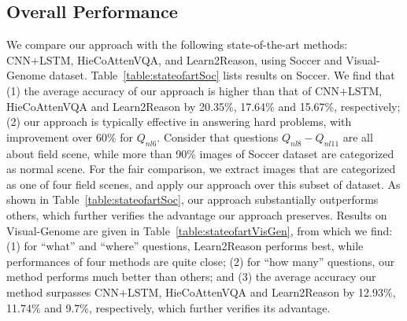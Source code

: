 %
%
%
%

\subsection{Overall Performance}
\label{sec-overall-performance}

We compare our approach with the following state-of-the-art methods: CNN+LSTM, HieCoAttenVQA, and Learn2Reason, using Soccer and Visual-Genome dataset. 
Table~\ref{table:stateofartSoc} lists results on Soccer. We find that (1) the average accuracy of our approach is higher than that of CNN+LSTM, HieCoAttenVQA and Learn2Reason by 20.35\%, 17.64\% and 15.67\%,  respectively; (2) our approach is typically effective in answering hard problems, \eg with improvement over 60\% for $Q_{nl6}$. 
Consider that questions $Q_{nl8}-Q_{nl11}$ are all about field scene, while more than 90\% images of Soccer dataset are categorized as normal scene. For the fair comparison, we extract images that are categorized as one of four field scenes, and apply our approach over this subset of dataset. As shown in Table~\ref{table:stateofartSoc}, our approach substantially outperforms others, which further verifies the advantage our approach preserves. 
Results on Visual-Genome are given in Table~\ref{table:stateofartVisGen}, from which we find: (1) for ``what'' and ``where'' questions, Learn2Reason performs best, while performances of four methods are quite close; (2) for ``how many'' questions, our method performs much better than others; and (3) the average accuracy our method  surpasses CNN+LSTM, HieCoAttenVQA and Learn2Reason by 12.93\%, 11.74\% and 9.7\%, respectively, which further verifies its advantage. 

